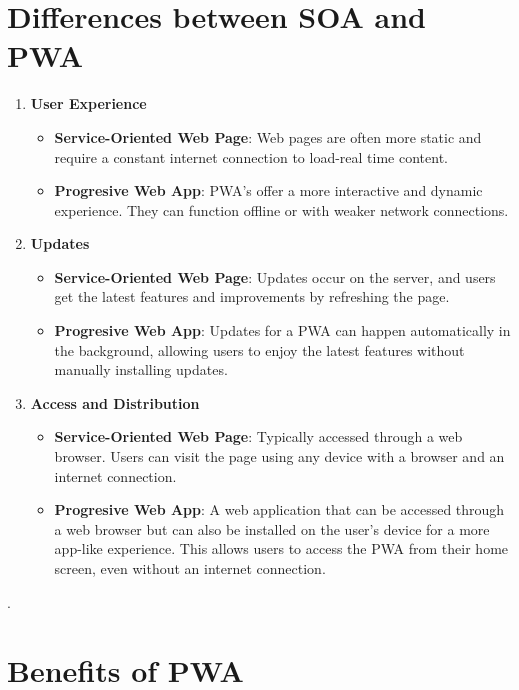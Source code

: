 \documentclass[12pt]{article}
\begin{document}
\section{Differences between SOA and PWA}
\begin{enumerate}[label=\arabic*., left=0pt, align=left]
    \item \textbf{User Experience}
    \begin{itemize}
        \item \textbf{Service-Oriented Web Page}: Web pages are often more static and require a constant internet connection to load-real time content.
        \item \textbf{Progresive Web App}: PWA's offer a more interactive and dynamic experience. They can function offline or with weaker network connections. 
    \end{itemize}
    \item \textbf{Updates}
    \begin{itemize}
        \item \textbf{Service-Oriented Web Page}: Updates occur on the server, and users get the latest features and improvements by refreshing the page.
        \item \textbf{Progresive Web App}: Updates for a PWA can happen automatically in the background, allowing users to enjoy the latest features without manually installing updates.
    \end{itemize}
    \item \textbf{Access and Distribution}
    \begin{itemize}
        \item \textbf{Service-Oriented Web Page}: Typically accessed through a web browser. Users can visit the page using any device with a browser and an internet connection.
        \item \textbf{Progresive Web App}: A web application that can be accessed through a web browser but can also be installed on the user's device for a more app-like experience. This allows users to access the PWA from their home screen, even without an internet connection.
    \end{itemize}
  \end{enumerate}
    \citep{SOA}.

\section{Benefits of PWA}
\end{document}
